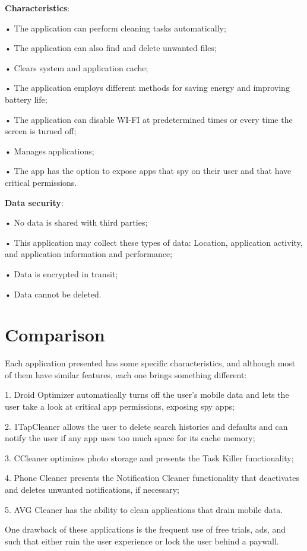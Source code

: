 \textbf{Characteristics}:

• The application can perform cleaning tasks automatically;

• The application can also find and delete unwanted files;

• Clears system and application cache;

• The application employs different methods for saving energy and improving battery life;

• The application can disable WI-FI at predetermined times or every time the screen is turned off;

• Manages applications;

• The app has the option to expose apps that spy on their user and that have critical permissions.

\textbf{Data security}:

• No data is shared with third parties;

• This application may collect these types of data: Location, application activity, and application information and performance;

• Data is encrypted in transit;

• Data cannot be deleted.

\newpage


\section{Comparison}\label{sect:comparison}
    Each application presented has some specific characteristics, and although most of them have similar features, each one brings something different:

    1.	Droid Optimizer automatically turns off the user's mobile data and lets the user take a look at critical app permissions, exposing spy apps;
    
    2.	1TapCleaner allows the user to delete search histories and defaults and can notify the user if any app uses too much space for its cache memory;

    3.	CCleaner optimizes photo storage and presents the Task Killer functionality;

    4.	Phone Cleaner presents the Notification Cleaner functionality that deactivates and deletes unwanted notifications, if necessary;

    5.	AVG Cleaner has the ability to clean applications that drain mobile data.

    One drawback of these applications is the frequent use of free trials, ads, and such that either ruin the user experience or lock the user behind a paywall.
    
